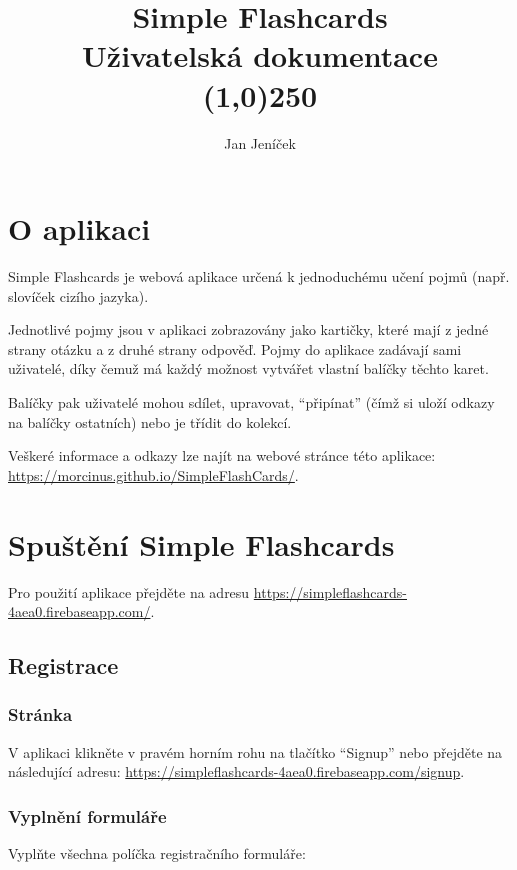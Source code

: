 \documentclass[a4paper,12pt]{article}
\begin{document}
\title{Simple Flashcards\\Uživatelská dokumentace \\\line(1,0){250}}
 \author{Jan Jeníček}
 \date{}
 \maketitle
 \clearpage
\tableofcontents
\clearpage

\section{O aplikaci}
Simple Flashcards je webová aplikace určená k jednoduchému učení pojmů (např. slovíček cizího jazyka). 

Jednotlivé pojmy jsou v aplikaci zobrazovány jako kartičky, které mají z jedné strany otázku a z druhé strany odpověď. Pojmy do aplikace zadávají sami uživatelé, díky čemuž má každý možnost vytvářet vlastní balíčky těchto karet.

Balíčky pak uživatelé mohou sdílet, upravovat, \enquote{připínat} (čímž si uloží odkazy na balíčky ostatních) nebo je třídit do kolekcí.


Veškeré informace a odkazy lze najít na webové stránce této aplikace: \href{https://morcinus.github.io/SimpleFlashCards/}{https://morcinus.github.io/SimpleFlashCards/}.

\section{Spuštění Simple Flashcards}
Pro použití aplikace přejděte na adresu \href{https://simpleflashcards-4aea0.firebaseapp.com/}{https://simpleflashcards-4aea0.firebaseapp.com/}.

\subsection{Registrace}
\subsubsection*{Stránka}
V aplikaci klikněte v pravém horním rohu na tlačítko \enquote{Signup} nebo přejděte na následující adresu: \href{https://simpleflashcards-4aea0.firebaseapp.com/signup}{https://simpleflashcards-4aea0.firebaseapp.com/signup}.

\subsubsection*{Vyplnění formuláře}
Vyplňte všechna políčka registračního formuláře:
\end{document}
